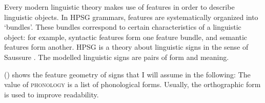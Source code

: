 {Every modern linguistic theory makes use of features in order to describe linguistic objects. In HPSG grammars, features are
systematically organized into `bundles'. These bundles correspond to certain characteristics of a linguistic object: for example, syntactic features
form one feature bundle, and semantic features form another. HPSG is a theory about linguistic signs in the sense of Saussure \citeyearpar{Saussure16a}.
The modelled linguistic signs are pairs of form and meaning.

() shows the feature geometry of signs that I will assume in the
following:
\ea
\ms[sign]
{ phonology   & \type{list~of~phoneme~strings}\\
  synsem & \onems[synsem]{ local \ms[local]{ category & \ms{ head   & \type{head} \\%
                                                             spr    & \type{list of synsem-objects} \\ 
                                                             comps  & \type{list of synsem-objects} \\ 
                                                             arg-st & \type{list of synsem-objects} \\ 
                                                           } \\
                                             content & \type{cont} \\
                                           } \\
                            nonlocal  \type{nonloc} \\ 
                            lex \type{boolean}\\
             } \\
}
\z
The value of \textsc{phonology} is a list of phonological forms.
Usually, the orthographic form is used to improve readability.

}
